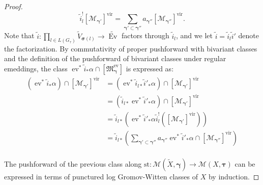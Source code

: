 \documentclass[12pt, oneside]{amsart}   	%
\newcommand{\vir}{\operatorname{vir}}
\newcommand{\ev}{\operatorname{ev}}
\newcommand{\Ev}{\operatorname{Ev}}
\numberwithin{equation}{section}
\numberwithin{thm}{section}
\numberwithin{figure}{section}
\begin{document}
\begin{proof}
$$\tilde{i}^!_l[\mathscr{M}_{\pmb\gamma'}]^{\vir} = \sum_{\pmb\gamma' \subset \pmb\gamma''} a_{\pmb\gamma''}[\mathscr{M}_{\pmb\gamma''}]^{\vir}.$$
Note that $\tilde{i}:\prod_{l \in L(G_{\tau})} \widetilde{V}_{\pmb\sigma(l)} \rightarrow \widetilde{\Ev}$ factors through $\tilde{i}_l$, and we let $\tilde{i} = \tilde{i}_l\tilde{i}'$ denote the factorization. By commutativity of proper pushforward with bivariant classes and the definition of the pushforward of bivariant classes under regular emeddings, the class $\ev^*\tilde{i}_*\alpha\cap[\mathfrak{M}^{\ev}_{\pmb\gamma}]$ is expressed as:
\begin{equation}\label{pusheq}
\begin{split}
(\ev^*\tilde{i}_*\alpha)\cap[\mathscr{M}_{\pmb\gamma'}]^{\vir} &= (\ev^*\tilde{i}_{l*}\tilde{i}'_*\alpha)\cap[\mathscr{M}_{\pmb\gamma'}]^{\vir}\\
&= (\tilde{i}_{l*}\ev^*\tilde{i}'_*\alpha)\cap[\mathscr{M}_{\pmb\gamma'}]^{\vir} \\
&= \tilde{i}_{l*}(\ev^*\tilde{i}'_*\alpha \tilde{i}_{l}^!([\mathscr{M}_{\pmb\gamma'}]^{\vir}))\\
&= \tilde{i}_{l*}(\sum_{\pmb\gamma' \subset \pmb\gamma''} a_{\pmb\gamma''}\ev^*\tilde{i}'_*\alpha\cap[\mathscr{M}_{\pmb\gamma''}]^{\vir})\\
\end{split}
\end{equation}

The pushforward of the previous class along $\text{st}: \mathscr{M}(\widetilde{X},\pmb\gamma) \rightarrow \mathscr{M}(X,\pmb\tau)$ can be expressed in terms of punctured log Gromov-Witten classes of $X$ by induction. 








\end{proof}
\end{document}
